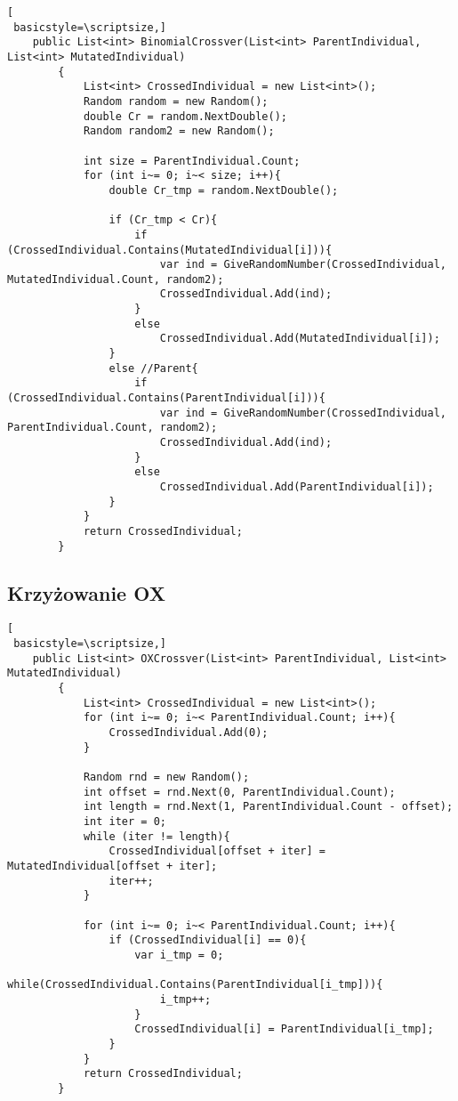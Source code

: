 \begin{lstlisting}[
 basicstyle=\scriptsize,]
	public List<int> BinomialCrossver(List<int> ParentIndividual, List<int> MutatedIndividual)
        {
            List<int> CrossedIndividual = new List<int>();
            Random random = new Random();
            double Cr = random.NextDouble();
            Random random2 = new Random();

            int size = ParentIndividual.Count;
            for (int i~= 0; i~< size; i++){
                double Cr_tmp = random.NextDouble();

                if (Cr_tmp < Cr){
                    if (CrossedIndividual.Contains(MutatedIndividual[i])){
                        var ind = GiveRandomNumber(CrossedIndividual, MutatedIndividual.Count, random2);
                        CrossedIndividual.Add(ind);
                    }
                    else
                        CrossedIndividual.Add(MutatedIndividual[i]);
                }
                else //Parent{
                    if (CrossedIndividual.Contains(ParentIndividual[i])){
                        var ind = GiveRandomNumber(CrossedIndividual, ParentIndividual.Count, random2);
                        CrossedIndividual.Add(ind);
                    }
                    else
                        CrossedIndividual.Add(ParentIndividual[i]);
                }
            }
            return CrossedIndividual;
        }
\end{lstlisting}

\subsection*{Krzyżowanie OX}

\begin{lstlisting}[
 basicstyle=\scriptsize,]
	public List<int> OXCrossver(List<int> ParentIndividual, List<int> MutatedIndividual)
        {
            List<int> CrossedIndividual = new List<int>();
            for (int i~= 0; i~< ParentIndividual.Count; i++){
                CrossedIndividual.Add(0);
            }

            Random rnd = new Random();
            int offset = rnd.Next(0, ParentIndividual.Count);
            int length = rnd.Next(1, ParentIndividual.Count - offset);
            int iter = 0;
            while (iter != length){
                CrossedIndividual[offset + iter] = MutatedIndividual[offset + iter];
                iter++;
            }

            for (int i~= 0; i~< ParentIndividual.Count; i++){
                if (CrossedIndividual[i] == 0){
                    var i_tmp = 0;
                    while(CrossedIndividual.Contains(ParentIndividual[i_tmp])){
                        i_tmp++;
                    }
                    CrossedIndividual[i] = ParentIndividual[i_tmp];
                }
            }
            return CrossedIndividual;
        }
\end{lstlisting}

